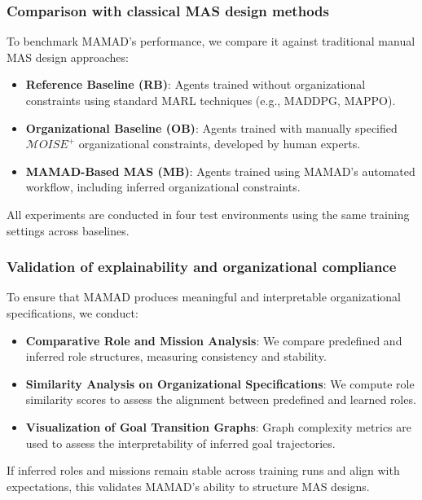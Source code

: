 \documentclass[pdflatex,sn-mathphys-num]{sn-jnl}%
\theoremstyle{thmstyleone}%
\theoremstyle{thmstyletwo}%
\theoremstyle{thmstylethree}%
\begin{document}
\subsubsection{Comparison with classical MAS design methods}
To benchmark MAMAD's performance, we compare it against traditional manual MAS design approaches:
\begin{itemize}
    \item \textbf{Reference Baseline (RB)}: Agents trained without organizational constraints using standard MARL techniques (e.g., MADDPG, MAPPO).
    \item \textbf{Organizational Baseline (OB)}: Agents trained with manually specified $\mathcal{M}OISE^+$ organizational constraints, developed by human experts.
    \item \textbf{MAMAD-Based MAS (MB)}: Agents trained using MAMAD's automated workflow, including inferred organizational constraints.
\end{itemize}

All experiments are conducted in four test environments using the same training settings across baselines.

\subsubsection{Validation of explainability and organizational compliance}
To ensure that MAMAD produces meaningful and interpretable organizational specifications, we conduct:
\begin{itemize}
    \item \textbf{Comparative Role and Mission Analysis}: We compare predefined and inferred role structures, measuring consistency and stability.
    \item \textbf{Similarity Analysis on Organizational Specifications}: We compute role similarity scores to assess the alignment between predefined and learned roles.
    \item \textbf{Visualization of Goal Transition Graphs}: Graph complexity metrics are used to assess the interpretability of inferred goal trajectories.
\end{itemize}

If inferred roles and missions remain stable across training runs and align with expectations, this validates MAMAD's ability to structure MAS designs.
\end{document}
